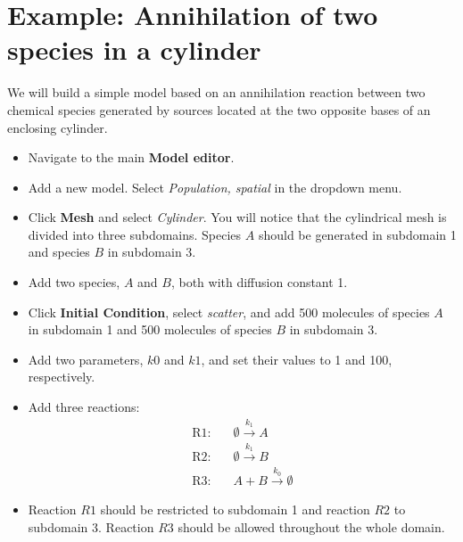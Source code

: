 \section{Example: Annihilation of two species in a cylinder}
We will build a simple model based on an annihilation reaction between two chemical species generated  by sources located at the two opposite bases of an enclosing cylinder.
\begin{itemize}
\item Navigate to the main \textbf{Model editor}.
\item Add a new model. Select \textit{Population, spatial} in the dropdown menu.
 \item Click \textbf{Mesh} and select \textit{Cylinder}. You will notice that the cylindrical mesh is divided into three subdomains. Species $A$ should be generated in subdomain 1 and species $B$ in subdomain 3.
\item Add two species, $A$ and $B$, both with diffusion constant 1.
\item Click \textbf{Initial Condition}, select \textit{scatter}, and add 500 molecules of species $A$ in subdomain 1 and 500 molecules of species $B$ in subdomain 3. 
\item Add two parameters, $k0$ and $k1$, and set their values to 1 and 100, respectively.
\item Add three reactions:%
\begin{align*}
\textrm{R1}:&\quad \emptyset\overset{k_1}{\rightarrow} A\\
\textrm{R2}:&\quad \emptyset\overset{k_1}{\rightarrow} B\\
\textrm{R3}:&\quad A+B\overset{k_0}{\rightarrow}\emptyset
\end{align*}
\item Reaction $R1$ should be restricted to subdomain 1 and reaction $R2$ to subdomain 3. Reaction $R3$ should be allowed throughout the whole domain.

\end{itemize}
